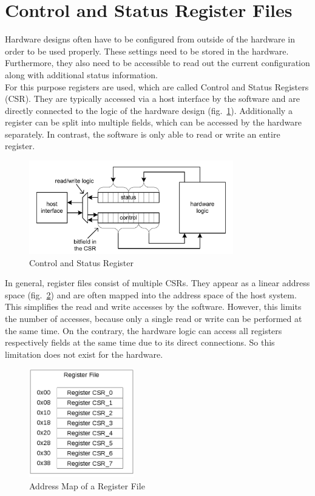 \section{Control and Status Register Files}
Hardware designs often have to be configured from outside of the hardware in order to be used properly. These settings need to be stored in the hardware. Furthermore, they also need to be accessible to read out the current configuration along with additional status information.\\
For this purpose registers are used, which are called Control and Status Registers (CSR). They are typically accessed via a host interface by the software and are directly connected to the logic of the hardware design (fig.~\ref{fig::csr}). Additionally a register can be split into multiple fields, which can be accessed by the hardware separately. In contrast, the software is only able to read or write an entire register.
\begin{figure}[h]
 \centering
 \includegraphics[width=252pt]{images/csr.png}
 \caption{Control and Status Register \cite{leber_diss}}
\label{fig::csr}
\end{figure}

In general, register files consist of multiple CSRs. They appear as a linear address space (fig.~\ref{fig::rf}) and are often mapped into the address space of the host system. This simplifies the read and write accesses by the software. However, this limits the number of accesses, because only a single read or write can be performed at the same time. On the contrary, the hardware logic can access all registers respectively fields at the same time due to its direct connections. So this limitation does not exist for the hardware.
\begin{figure}[h]
 \centering
 \includegraphics[width=130pt]{images/rf.png}
 \caption{Address Map of a Register File}
\label{fig::rf}
\end{figure}
